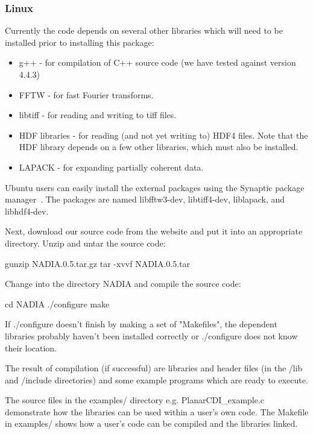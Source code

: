 \documentclass[]{nadia}
\begin{document}
\subsubsection{Linux}

Currently the code depends on several other libraries which will need to
be installed prior to installing this package:
\begin{itemize}
\item g++\cite{g++} - for compilation of C++ source code (we have tested against version 4.4.3)
\item FFTW\cite{FFTW05} - for fast Fourier transforms.
\item libtiff\cite{libtiff} - for reading and writing to tiff files.
\item HDF libraries\cite{hdf} - for reading (and not yet writing to) HDF4
  files. Note that the HDF library depends on a few other libraries,
  which must also be installed.
\item LAPACK\cite{lapack} - for expanding partially coherent data.
\end{itemize}

Ubuntu users can easily install the external packages using the
Synaptic package manager~\cite{synaptic}. The packages are named libfftw3-dev,
libtiff4-dev, liblapack, and libhdf4-dev.

Next, download our source code from the website and put it into an
appropriate directory. Unzip and untar the source code:
\begin{myverbatim}
  gunzip NADIA.0.5.tar.gz 
  tar -xvvf NADIA.0.5.tar
\end{myverbatim}

Change into the directory NADIA and compile the source code: 
\begin{myverbatim}
  cd NADIA
  ./configure 
  make
\end{myverbatim}

If ./configure doesn't finish by making a set of "Makefiles", the
dependent libraries probably haven't been installed correctly or
./configure does not know their location.

The result of compilation (if successful) are libraries and header
files (in the /lib and /include directories) and some example programs
which are ready to execute.

The source files in the examples/ directory e.g. PlanarCDI\_example.c
demonstrate how the libraries can be used within a user's own
code. The Makefile in examples/ shows how a user's code can be
compiled and the \name libraries linked.
\end{document}
